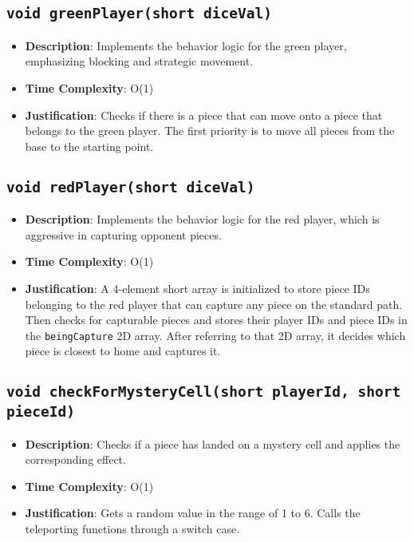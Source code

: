 \documentclass{article}
\begin{document}
\subsection{\texttt{void greenPlayer(short diceVal)}}
\begin{itemize}
    \item \textbf{Description}: Implements the behavior logic for the green player, emphasizing blocking and strategic movement.
    \item \textbf{Time Complexity}: O(1)
    \item \textbf{Justification}: Checks if there is a piece that can move onto a piece that belongs to the green player. The first priority is to move all pieces from the base to the starting point.
\end{itemize}

\subsection{\texttt{void redPlayer(short diceVal)}}
\begin{itemize}
    \item \textbf{Description}: Implements the behavior logic for the red player, which is aggressive in capturing opponent pieces.
    \item \textbf{Time Complexity}: O(1)
    \item \textbf{Justification}: A 4-element short array is initialized to store piece IDs belonging to the red player that can capture any piece on the standard path. Then checks for capturable pieces and stores their player IDs and piece IDs in the \texttt{beingCapture} 2D array. After referring to that 2D array, it decides which piece is closest to home and captures it.
\end{itemize}

\subsection{\texttt{void checkForMysteryCell(short playerId, short pieceId)}}
\begin{itemize}
    \item \textbf{Description}: Checks if a piece has landed on a mystery cell and applies the corresponding effect.
    \item \textbf{Time Complexity}: O(1)
    \item \textbf{Justification}: Gets a random value in the range of 1 to 6. Calls the teleporting functions through a switch case.
\end{itemize}
\end{document}
